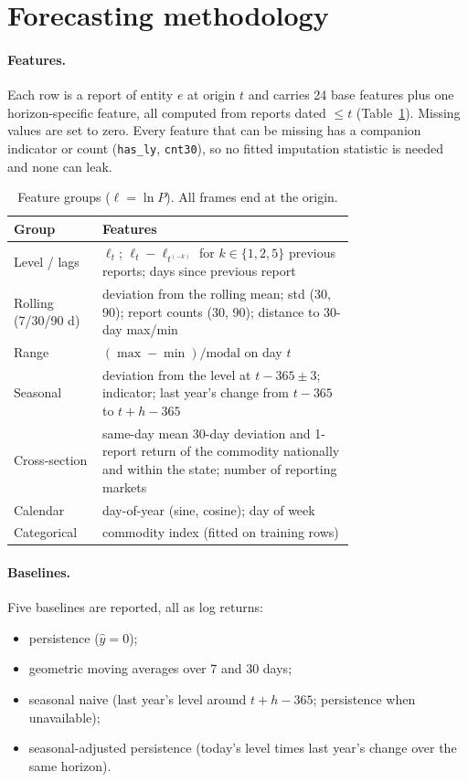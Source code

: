 \section{Forecasting methodology}\label{sec:method}

\paragraph{Features.}
Each row is a report of entity $e$ at origin $t$ and carries 24 base features plus one horizon-specific feature, all computed from reports dated $\le t$ (Table~\ref{tab:features}).
Missing values are set to zero.
Every feature that can be missing has a companion indicator or count (\texttt{has\_ly}, \texttt{cnt30}), so no fitted imputation statistic is needed and none can leak.

\begin{table}[t]
\centering\small
\caption{Feature groups ($\ell=\ln P$). All frames end at the origin.}\label{tab:features}
\begin{tabular}{@{}lp{0.74\linewidth}@{}}
\toprule
Group & Features \\
\midrule
Level / lags & $\ell_t$; $\ell_t-\ell_{t^{(-k)}}$ for $k\in\{1,2,5\}$ previous reports; days since previous report \\
Rolling (7/30/90 d) & deviation from the rolling mean; std (30, 90); report counts (30, 90); distance to 30-day max/min \\
Range & $(\max-\min)/\text{modal}$ on day $t$ \\
Seasonal & deviation from the level at $t-365\pm3$; indicator; last year's change from $t-365$ to $t+h-365$ \\
Cross-section & same-day mean 30-day deviation and 1-report return of the commodity nationally and within the state; number of reporting markets \\
Calendar & day-of-year (sine, cosine); day of week \\
Categorical & commodity index (fitted on training rows) \\
\bottomrule
\end{tabular}
\end{table}

\paragraph{Baselines.}
Five baselines are reported, all as log returns:
\begin{itemize}
  \item persistence ($\hat y=0$);
  \item geometric moving averages over 7 and 30 days;
  \item seasonal naive (last year's level around $t+h-365$; persistence when unavailable);
  \item seasonal-adjusted persistence (today's level times last year's change over the same horizon).
\end{itemize}

